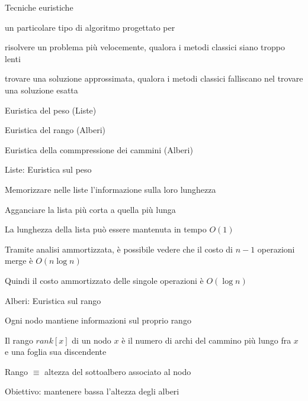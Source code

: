 \begin{frame}{Tecniche euristiche}

\vspace{-6pt}
\begin{myboxtitle}
\EE un particolare tipo di algoritmo progettato per 
\BI
\item risolvere un problema  più velocemente, qualora i metodi classici 
siano troppo lenti
\item trovare una soluzione approssimata, qualora i metodi classici 
falliscano nel trovare una soluzione esatta
\EI
\end{myboxtitle}

\pause
\medskip
{}
\BIL
\item Euristica del peso (Liste)
\item Euristica del rango (Alberi)
\item Euristica della commpressione dei cammini (Alberi)
\EIL

\end{frame}

\begin{frame}{Liste: Euristica sul peso}

\BIL
\item Memorizzare nelle liste l’informazione sulla loro lunghezza
\item Agganciare la lista più corta a quella più lunga
\item La lunghezza della lista può essere mantenuta in tempo $O(1)$
\EIL 

\BIL
\item Tramite analisi ammortizzata, è possibile vedere che il costo
di $n-1$ operazioni merge è $O(n \log n)$
\item Quindi il costo ammortizzato delle singole operazioni è $O(\log n)$
\EIL
\end{frame}

\begin{frame}{Alberi: Euristica sul rango}

\BIL
\item Ogni nodo mantiene informazioni sul proprio rango
\item Il rango $\mathit{rank}[x]$ di un nodo $x$ è il numero di archi 
del cammino più lungo fra $x$ e una foglia sua discendente
\item Rango $\equiv$ altezza del sottoalbero associato al nodo
\item Obiettivo: mantenere bassa l'altezza degli alberi
\EIL 

\end{frame}

